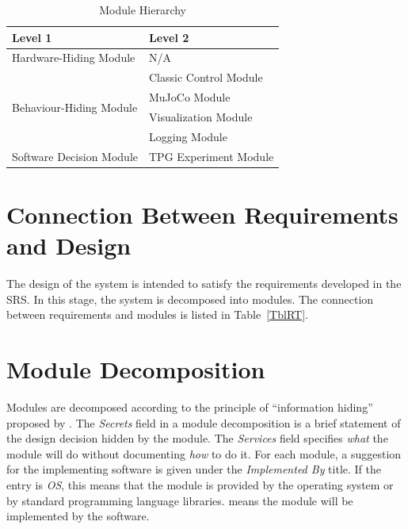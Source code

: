 \documentclass[12pt, titlepage]{article}
\begin{document}
\begin{table}[h!]
\centering
\begin{tabular}{p{} p{}}
\toprule
\textbf{Level 1} & \textbf{Level 2}\\
\midrule

{Hardware-Hiding Module} & N/A \\
\midrule

\multirow{4}{0.3\textwidth}{Behaviour-Hiding Module} & Classic Control Module \\
& MuJoCo Module\\
& Visualization Module\\
& Logging Module\\
\midrule

\multirow{1}{0.3\textwidth}{Software Decision Module} & {TPG Experiment Module}\\
\bottomrule

\end{tabular}
\caption{Module Hierarchy}
\label{TblMH}
\end{table}

\section{Connection Between Requirements and Design} \label{SecConnection}

The design of the system is intended to satisfy the requirements developed in
the SRS. In this stage, the system is decomposed into modules. The connection
between requirements and modules is listed in Table~\ref{TblRT}.

\section{Module Decomposition} \label{SecMD}

Modules are decomposed according to the principle of ``information hiding''
proposed by \citet{ParnasEtAl1984}. The \emph{Secrets} field in a module
decomposition is a brief statement of the design decision hidden by the
module. The \emph{Services} field specifies \emph{what} the module will do
without documenting \emph{how} to do it. For each module, a suggestion for the
implementing software is given under the \emph{Implemented By} title. If the
entry is \emph{OS}, this means that the module is provided by the operating
system or by standard programming language libraries.  \emph{\progname{}} means the
module will be implemented by the \progname{} software.
\end{document}
